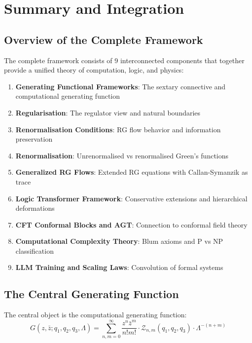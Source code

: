 
\section{Summary and Integration}

\subsection{Overview of the Complete Framework}

The complete framework consists of 9 interconnected components that together provide a unified theory of computation, logic, and physics:

\begin{enumerate}
\item \textbf{Generating Functional Frameworks}: The sextary connective and computational generating function
\item \textbf{Regularisation}: The regulator view and natural boundaries
\item \textbf{Renormalisation Conditions}: RG flow behavior and information preservation
\item \textbf{Renormalisation}: Unrenormalised vs renormalised Green's functions
\item \textbf{Generalized RG Flows}: Extended RG equations with Callan-Symanzik as trace
\item \textbf{Logic Transformer Framework}: Conservative extensions and hierarchical deformations
\item \textbf{CFT Conformal Blocks and AGT}: Connection to conformal field theory
\item \textbf{Computational Complexity Theory}: Blum axioms and P vs NP classification
\item \textbf{LLM Training and Scaling Laws}: Convolution of formal systems
\end{enumerate}

\subsection{The Central Generating Function}

The central object is the computational generating function:
\[
G(z, \bar{z}; q_1, q_2, q_3, \Lambda) = \sum_{n,m=0}^{\infty} \frac{z^n \bar{z}^m}{n! m!} \cdot \mathcal{Z}_{n,m}(q_1, q_2, q_3) \cdot \Lambda^{-(n+m)}
\]

